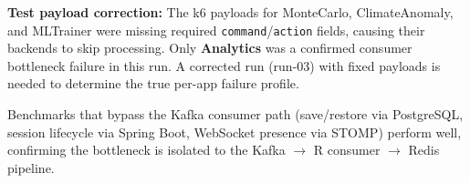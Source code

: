 \documentclass[11pt,a4paper]{article}
\begin{document}
\textbf{Test payload correction:} The k6 payloads for MonteCarlo, ClimateAnomaly,
and MLTrainer were missing required \texttt{command}/\texttt{action} fields, causing
their backends to skip processing. Only \textbf{Analytics} was a confirmed consumer
bottleneck failure in this run. A corrected run (run-03) with fixed payloads is
needed to determine the true per-app failure profile.

Benchmarks that bypass the Kafka consumer path (save/restore via PostgreSQL, session
lifecycle via Spring Boot, WebSocket presence via STOMP) perform well, confirming the
bottleneck is isolated to the Kafka $\to$ R consumer $\to$ Redis pipeline.
\end{document}
